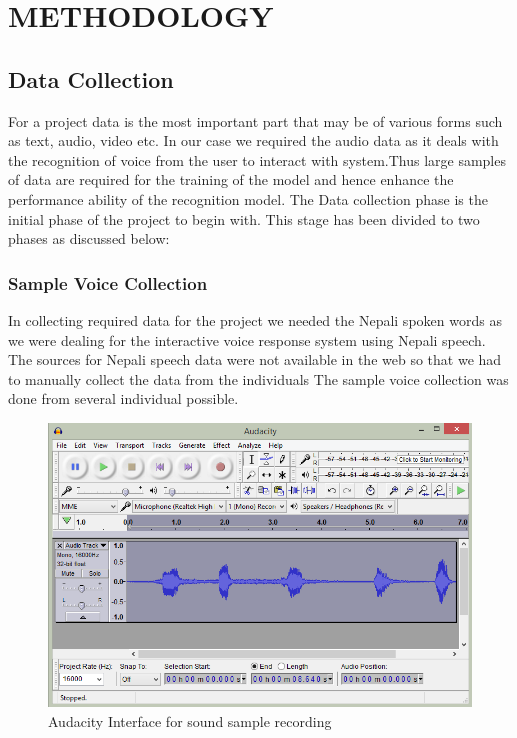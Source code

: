 

\section{METHODOLOGY}

\subsection{Data Collection}
For a project data is the most important part that may be of various forms such as text, audio, video etc. In our case we required the audio data
as it deals with the recognition of voice from the user to interact with 
system.Thus large samples of data are required for the training of the 
model and hence enhance the performance ability of the recognition model.
The Data collection phase is the initial phase of the project to 
begin with. This stage has been divided to two phases as discussed below:

\subsubsection{Sample Voice Collection}
In collecting required data for the project we needed the Nepali spoken 
words as we were dealing for the interactive voice response system
using Nepali speech. The sources for Nepali speech data were not available
in the web so that we had to manually collect the data from the individuals
The sample voice collection was done from several individual possible.
\begin{figure}[h]
	\begin{center}
		\includegraphics[scale=0.7]{images/audacity.png}
		\caption{Audacity Interface for sound sample recording}
		\label{audacity}
	\end{center}
\end{figure}


